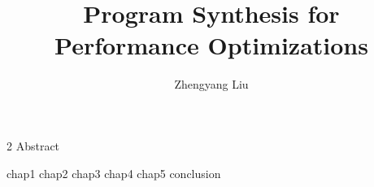 \documentclass[11pt,Chicago]{uuthesis2e}
\author                 {Zhengyang Liu}
\title                  {Program Synthesis for \\ Performance Optimizations}
\begin{document}
\frontmatterformat
\titlepage
\copyrightpage
\dissertationapproval
\setcounter {page}     {2}             %
 {Abstract}
\dedicationpage
\tableofcontents
\listoffigures
\listoftables
%





\maintext       %

\pagestyle{headings} %

\newcommand{\minotaur}{Minotaur}

 {chap1}
 {chap2}
 {chap3}
 {chap4}
 {chap5}
 {conclusion}


\end{document}
